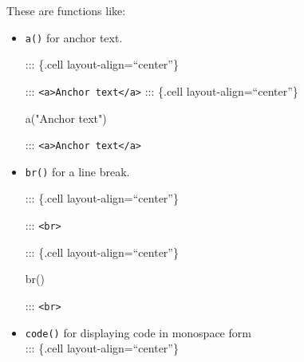 \documentclass[
  letterpaper,
  DIV=11,
  numbers=noendperiod]{scrreprt}
\newenvironment{Shaded}{\begin{snugshade}}{\end{snugshade}}
\newcommand{\FunctionTok}[1]{\textcolor[rgb]{0.28,0.35,0.67}{#1}}
\newcommand{\NormalTok}[1]{\textcolor[rgb]{0.00,0.46,0.62}{#1}}
\newcommand{\SpecialCharTok}[1]{\textcolor[rgb]{0.37,0.37,0.37}{#1}}
\newcommand{\StringTok}[1]{\textcolor[rgb]{0.13,0.47,0.30}{#1}}
\begin{document}
These are functions like:

\begin{itemize}
\item
  \texttt{a()} for anchor text.

  ::: \{.cell layout-align=``center''\}

\begin{Shaded}
\end{Shaded}

  :::
  \texttt{\textless{}a\textgreater{}Anchor\ text\textless{}/a\textgreater{}}
  ::: \{.cell layout-align=``center''\}

\begin{Shaded}
\begin{Highlighting}[]
\FunctionTok{a}\NormalTok{(}\StringTok{"Anchor text"}\NormalTok{)}
\end{Highlighting}
\end{Shaded}

  :::
  \texttt{\textless{}a\textgreater{}Anchor\ text\textless{}/a\textgreater{}}
\item
  \texttt{br()} for a line break.

  ::: \{.cell layout-align=``center''\}

\begin{Shaded}
\end{Shaded}

  ::: \texttt{\textless{}br\textgreater{}}

  ::: \{.cell layout-align=``center''\}

\begin{Shaded}
\begin{Highlighting}[]
\FunctionTok{br}\NormalTok{()}
\end{Highlighting}
\end{Shaded}

  ::: \texttt{\textless{}br\textgreater{}}
\item
  \texttt{code()} for displaying code in monospace form\\
  ::: \{.cell layout-align=``center''\}

\begin{Shaded}
\end{Shaded}


\end{itemize}
\end{document}
